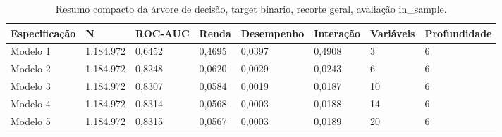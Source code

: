 \begin{table}
\caption{Resumo compacto da árvore de decisão, target binario, recorte geral, avaliação in_sample.}
\label{tab:tabela_compacta_treeClassification_binario_recorte_geral_in_sample}
\begin{tabular}{llllllll}
\toprule
Especificação & N & ROC-AUC & Renda & Desempenho & Interação & Variáveis & Profundidade \\
\midrule
Modelo 1 & 1.184.972 & 0,6452 & 0,4695 & 0,0397 & 0,4908 & 3 & 6 \\
Modelo 2 & 1.184.972 & 0,8248 & 0,0620 & 0,0029 & 0,0243 & 6 & 6 \\
Modelo 3 & 1.184.972 & 0,8307 & 0,0584 & 0,0019 & 0,0187 & 10 & 6 \\
Modelo 4 & 1.184.972 & 0,8314 & 0,0568 & 0,0003 & 0,0188 & 14 & 6 \\
Modelo 5 & 1.184.972 & 0,8315 & 0,0567 & 0,0003 & 0,0189 & 20 & 6 \\
\bottomrule
\end{tabular}
\end{table}
